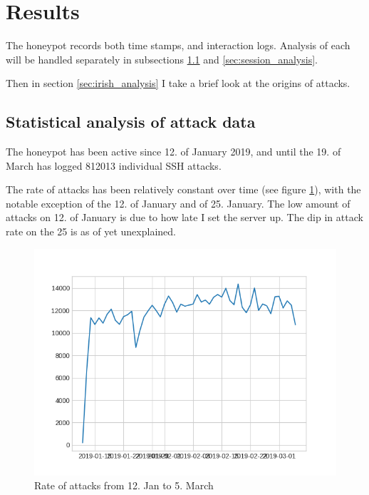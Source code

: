 \section{Results}
\label{sec:results}

    The honeypot records both time stamps, and 
    interaction logs. Analysis of each will be handled separately 
    in subsections \ref{sec:time_analysis} and 
    \ref{sec:session_analysis}. 

    Then in section \ref{sec:irish_analysis} I take 
    a brief look at the origins of attacks.

\subsection{Statistical analysis of attack data}
\label{sec:time_analysis}

    The honeypot has been active since 12. of January
    2019, and until the 19. of March has logged 
    812013 individual SSH attacks. 


    The rate of attacks has been relatively constant over
    time (see figure \ref{fig:attacks_over_time}), with 
    the notable exception of the 12. of January and of 25. 
    January. The low amount of attacks on 12. of January is due 
    to how late I set the server up. 
    The dip in attack rate on the 25 is as of yet 
    unexplained.


    \begin{figure}[H]
        \centering
        \includegraphics[width=0.85 \textwidth]{src/images/over_time.png}
        \caption{Rate of attacks from 12. Jan to 5. March}
        \label{fig:attacks_over_time}
    \end{figure}


